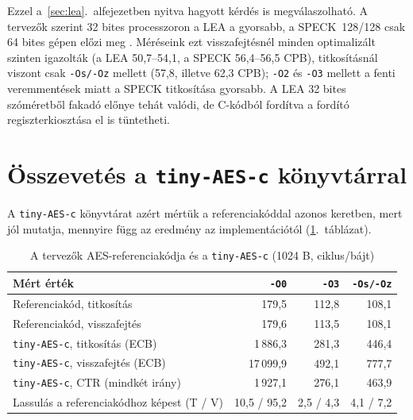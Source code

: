 \documentclass[a4paper,12pt]{report}
\theoremstyle{definition}
\theoremstyle{remark}
\begin{document}
Ezzel a~\ref{sec:lea}.~alfejezetben nyitva hagyott kérdés is megválaszolható. A tervezők szerint 32 bites processzoron a LEA a gyorsabb, a SPECK~128/128 csak 64 bites gépen előzi meg \cite{Hong2013}. Méréseink ezt visszafejtésnél minden optimalizált szinten igazolták (a LEA 50,7--54,1, a SPECK 56,4--56,5 CPB), titkosításnál viszont csak \texttt{-Os/-Oz} mellett (57,8, illetve 62,3 CPB); \texttt{-O2} és \texttt{-O3} mellett a fenti veremmentések miatt a SPECK titkosítása gyorsabb. A LEA 32 bites szóméretből fakadó előnye tehát valódi, de C-kódból fordítva a fordító regiszterkiosztása el is tüntetheti.

\section{Összevetés a \texttt{tiny-AES-c} könyvtárral}\label{sec:tiny}

A \texttt{tiny-AES-c} könyvtárat \cite{TinyAES} azért mértük a referenciakóddal azonos keretben, mert jól mutatja, mennyire függ az eredmény az implementációtól (\ref{tab:tiny}.~táblázat).

\begin{table}[htbp]
    \centering
    \small
    \caption{A tervezők AES-referenciakódja és a \texttt{tiny-AES-c} (1024 B, ciklus/bájt)}
    \label{tab:tiny}
    \begin{tabular}{|l|r|r|r|}
        \hline
        \textbf{Mért érték} & \textbf{\texttt{-O0}} & \textbf{\texttt{-O3}} & \textbf{\texttt{-Os/-Oz}} \\ \hline
        Referenciakód, titkosítás & 179,5 & 112,8 & 108,1 \\ \hline
        Referenciakód, visszafejtés & 179,6 & 113,5 & 108,1 \\ \hline
        \texttt{tiny-AES-c}, titkosítás (ECB) & 1\,886,3 & 281,3 & 446,4 \\ \hline
        \texttt{tiny-AES-c}, visszafejtés (ECB) & 17\,099,9 & 492,1 & 777,7 \\ \hline
        \texttt{tiny-AES-c}, CTR (mindkét irány) & 1\,927,1 & 276,1 & 463,9 \\ \hline
        Lassulás a referenciakódhoz képest (T / V) & 10,5 / 95,2 & 2,5 / 4,3 & 4,1 / 7,2 \\ \hline
    \end{tabular}
\end{table}
\end{document}
